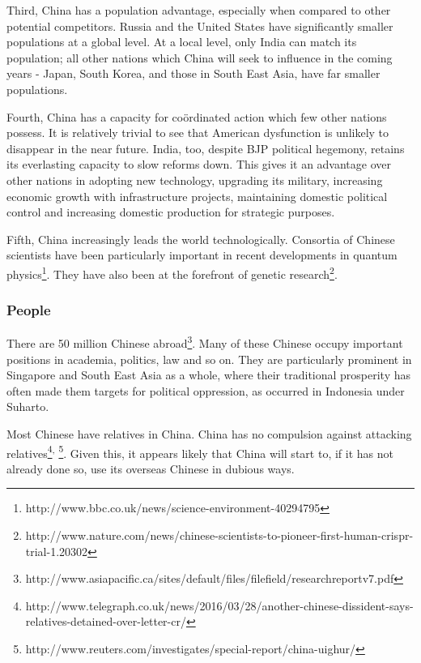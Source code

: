 	Third, China has a population advantage, especially when compared to
	other potential competitors. Russia and the United States have
	significantly smaller populations at a global level. At a local level,
	only India can match its population; all other nations which China will
	seek to influence in the coming years - Japan, South Korea, and those in
	South East Asia, have far smaller populations.

	Fourth, China has a capacity for coördinated action which few other
	nations possess. It is relatively trivial to see that American
	dysfunction is unlikely to disappear in the near future. India, too,
	despite BJP political hegemony, retains its everlasting capacity to slow
	reforms down. This gives it an advantage over other nations in adopting
	new technology, upgrading its military, increasing economic growth with
	infrastructure projects, maintaining domestic political control and
	increasing domestic production for strategic purposes.

	Fifth, China increasingly leads the world technologically. Consortia of
	Chinese scientists have been particularly important in recent
	developments in quantum physics\footnote{http://www.bbc.co.uk/news/science-environment-40294795}.
	They have also been at the forefront of genetic research\footnote{http://www.nature.com/news/chinese-scientists-to-pioneer-first-human-crispr-trial-1.20302}.


\subsubsection{People}\label{people}


	There are 50 million Chinese abroad\footnote{http://www.asiapacific.ca/sites/default/files/filefield/researchreportv7.pdf}.
	Many of these Chinese occupy important positions in academia, politics,
	law and so on. They are particularly prominent in Singapore and South
	East Asia as a whole, where their traditional prosperity has often made
	them targets for political oppression, as occurred in Indonesia under
	Suharto.

	Most Chinese have relatives in China. China has no compulsion against
	attacking relatives\footnote{http://www.telegraph.co.uk/news/2016/03/28/another-chinese-dissident-says-relatives-detained-over-letter-cr/}\textsuperscript{,}
	\footnote{http://www.reuters.com/investigates/special-report/china-uighur/}.
	Given this, it appears likely that China will start to, if it has not
	already done so, use its overseas Chinese in dubious ways.

